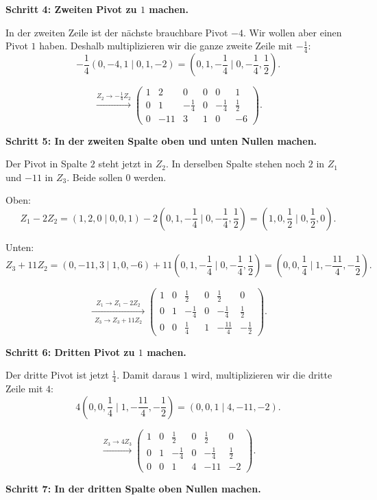 \documentclass[a4paper,12pt]{article}
\begin{document}
\textbf{Schritt 4: Zweiten Pivot zu $1$ machen.}

In der zweiten Zeile ist der n\"achste brauchbare Pivot $-4$.
Wir wollen aber einen Pivot $1$ haben.
Deshalb multiplizieren wir die ganze zweite Zeile mit $-\frac14$:
\[
-\frac14(0,-4,1\mid 0,1,-2)
=
\left(0,1,-\frac14 \mid 0,-\frac14,\frac12\right).
\]

\[
\xrightarrow{Z_2\to -\frac14 Z_2}
\left(\begin{array}{ccc|ccc}
1 & 2 & 0 & 0 & 0 & 1 \\
0 & 1 & -\frac14 & 0 & -\frac14 & \frac12 \\
0 & -11 & 3 & 1 & 0 & -6
\end{array}\right).
\]

\textbf{Schritt 5: In der zweiten Spalte oben und unten Nullen machen.}

Der Pivot in Spalte $2$ steht jetzt in $Z_2$.
In derselben Spalte stehen noch $2$ in $Z_1$ und $-11$ in $Z_3$.
Beide sollen $0$ werden.

Oben:
\[
Z_1-2Z_2
=
(1,2,0\mid 0,0,1)-2\left(0,1,-\frac14\mid 0,-\frac14,\frac12\right)
=
\left(1,0,\frac12\mid 0,\frac12,0\right).
\]

Unten:
\[
Z_3+11Z_2
=
(0,-11,3\mid 1,0,-6)
+11\left(0,1,-\frac14\mid 0,-\frac14,\frac12\right)
=
\left(0,0,\frac14\mid 1,-\frac{11}{4},-\frac12\right).
\]

\[
\xrightarrow[\substack{Z_3\to Z_3+11Z_2}]{Z_1\to Z_1-2Z_2}
\left(\begin{array}{ccc|ccc}
1 & 0 & \frac12 & 0 & \frac12 & 0 \\
0 & 1 & -\frac14 & 0 & -\frac14 & \frac12 \\
0 & 0 & \frac14 & 1 & -\frac{11}{4} & -\frac12
\end{array}\right).
\]

\textbf{Schritt 6: Dritten Pivot zu $1$ machen.}

Der dritte Pivot ist jetzt $\frac14$.
Damit daraus $1$ wird, multiplizieren wir die dritte Zeile mit $4$:
\[
4\left(0,0,\frac14\mid 1,-\frac{11}{4},-\frac12\right)
=
(0,0,1\mid 4,-11,-2).
\]

\[
\xrightarrow{Z_3\to 4Z_3}
\left(\begin{array}{ccc|ccc}
1 & 0 & \frac12 & 0 & \frac12 & 0 \\
0 & 1 & -\frac14 & 0 & -\frac14 & \frac12 \\
0 & 0 & 1 & 4 & -11 & -2
\end{array}\right).
\]

\textbf{Schritt 7: In der dritten Spalte oben Nullen machen.}
\end{document}
